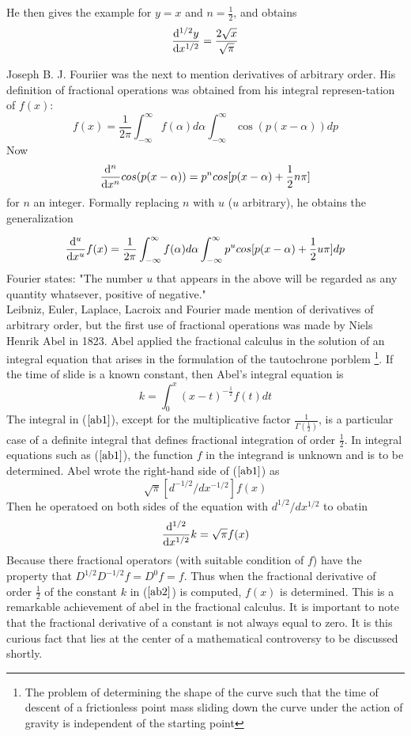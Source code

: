 \documentclass[twoside]{book}
\begin{document}
{He then gives the example for $y=x$ and $n=\frac{1}{2}$, and obtains
$$\dv[1/2]{y}{x} = \frac{2\sqrt{x}}{\sqrt{\pi}}$$

Joseph B. J. Fouriier was the next to mention derivatives of arbitrary order. His definition of fractional operations was obtained from his integral represen-tation of $f(x)$:
$$ f(x) = \frac{1}{2\pi} \int_{-\infty}^{\infty} f(\alpha) d\alpha \int_{-\infty}^{\infty} \cos{(p(x-\alpha))} dp $$
Now
$$\dv[n]{}{x} cos(p(x-\alpha)) = p^n cos[p(x-\alpha) + \frac{1}{2} n \pi]$$
for $n$ an integer. Formally replacing $n$ with $u$ ($u$ arbitrary), he obtains the generalization

$$\dv[u]{}{x} f(x) = \frac{1}{2\pi} \int_{-\infty}^{\infty} f(\alpha) d\alpha \int_{-\infty}^{\infty} p^u cos[p(x-\alpha) + \frac{1}{2}u \pi] dp$$
Fourier states: "The number $u$ that appears in the above will be regarded as any quantity whatsever, positive of negative."\\
\newline
Leibniz, Euler, Laplace, Lacroix and Fourier made mention of derivatives of arbitrary order, but the first use of fractional operations was made by Niels Henrik Abel in 1823. Abel applied the fractional calculus in the solution of an integral equation that arises in the formulation of the tautochrone porblem \footnote{ The problem of determining the shape of the curve such that the time of descent of a frictionless point mass sliding down the curve under the action of gravity is independent of the starting point}. If the time of slide is a known constant, then Abel's integral equation is
\begin{equation}
    \label{ab1}
    k=\int_0^x (x-t)^{-\frac{1}{2}} f(t) dt
\end{equation}
The integral in ($\ref{ab1}$), except for the multiplicative factor $\frac{1}{\Gamma{(\frac{1}{2})}}$, is a particular case of a definite integral that defines fractional integration of order $\frac{1}{2}$. In integral equations such as ($\ref{ab1}$), the function $f$ in the integrand is unknown and is to be determined. Abel wrote the right-hand side of ($\ref{ab1}$) as
$$\sqrt{\pi}[d^{-1/2}/dx^{-1/2}]f(x)$$
Then he operatoed on both sides of the equation with $d^{1/2}/dx^{1/2}$ to obatin
\begin{equation}
    \label{ab2}
    \dv[1/2]{}{x} k = \sqrt{\pi} f(x)
\end{equation}
Because there fractional operators (with suitable condition of $f$) have the property that $D^{1/2}D^{-1/2} f = D^0 f = f$. Thus when the fractional derivative of order $\frac{1}{2}$ of the constant $k$ in ($\ref{ab2}$) is computed, $f(x)$ is determined. This is a remarkable achievement of abel in the fractional calculus. It is important to note that the fractional derivative of a constant is not always equal to zero. It is this curious fact that lies at the center of a mathematical controversy to be discussed shortly.\\
}
\end{document}

